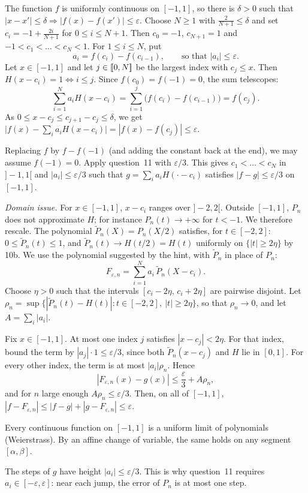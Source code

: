 \documentclass[11pt,a4paper]{article}
\begin{document}
The function $f$ is uniformly continuous on $[-1,1]$, so there is $\delta>0$ such that
$|x-x'|\le\delta \Rightarrow |f(x)-f(x')|\le\varepsilon$. Choose $N\ge1$ with
$\frac2{N+1}\le\delta$ and set $c_i = -1 + \frac{2i}{N+1}$ for $0\le i\le N+1$. Then
$c_0 = -1$, $c_{N+1} = 1$ and $-1 < c_1 < \dots < c_N < 1$. For $1 \le i \le N$, put
\[
  a_i = f(c_i) - f(c_{i-1}), \qquad\text{so that } |a_i|\le\varepsilon .
\]
Let $x\in[-1,1]$ and let $j\in[\![0,N]\!]$ be the largest index with $c_j\le x$. Then
$H(x-c_i) = 1 \iff i \le j$. Since $f(c_0) = f(-1) = 0$, the sum telescopes:
\[
  \sum_{i=1}^N a_i H(x-c_i) = \sum_{i=1}^{j}\bigl(f(c_i)-f(c_{i-1})\bigr) = f(c_j).
\]
As $0\le x-c_j\le c_{j+1}-c_j\le\delta$, we get
$\bigl|f(x) - \sum_i a_iH(x-c_i)\bigr| = |f(x)-f(c_j)| \le \varepsilon$.

Replacing $f$ by $f - f(-1)$ (and adding the constant back at the end), we may assume
$f(-1) = 0$. Apply question~11 with $\varepsilon/3$. This gives $c_1<\dots<c_N$ in $]-1,1[$
and $|a_i|\le\varepsilon/3$ such that $g = \sum_i a_iH(\cdot-c_i)$ satisfies
$|f-g|\le\varepsilon/3$ on $[-1,1]$.

\emph{Domain issue.} For $x\in[-1,1]$, $x - c_i$ ranges over $]-2,2[$. Outside $[-1,1]$,
$P_n$ does not approximate $H$; for instance $P_n(t)\to+\infty$ for $t<-1$. We therefore
rescale. The polynomial $\widetilde P_n(X) = P_n(X/2)$ satisfies, for $t\in[-2,2]$:
$0\le\widetilde P_n(t)\le1$, and $\widetilde P_n(t)\to H(t/2) = H(t)$ uniformly on
$\{|t|\ge2\eta\}$ by 10b. We use the polynomial suggested by the hint, with $\widetilde P_n$
in place of $P_n$:
\[
  F_{\varepsilon,n} = \sum_{i=1}^N a_i\,\widetilde P_n(X-c_i).
\]
Choose $\eta>0$ such that the intervals $[c_i-2\eta,\,c_i+2\eta]$ are pairwise disjoint. Let
$\rho_n = \sup\{|\widetilde P_n(t)-H(t)| : t\in[-2,2],\ |t|\ge2\eta\}$, so that
$\rho_n\to0$, and let $A = \sum_i|a_i|$.

Fix $x\in[-1,1]$. At most one index $j$ satisfies $|x-c_j|<2\eta$. For that index, bound the
term by $|a_j|\cdot1\le\varepsilon/3$, since both $\widetilde P_n(x-c_j)$ and $H$ lie in
$[0,1]$. For every other index, the term is at most $|a_i|\rho_n$. Hence
\[
  |F_{\varepsilon,n}(x) - g(x)| \le \frac\varepsilon3 + A\rho_n ,
\]
and for $n$ large enough $A\rho_n\le\varepsilon/3$. Then, on all of $[-1,1]$,
$|f - F_{\varepsilon,n}| \le |f-g| + |g - F_{\varepsilon,n}| \le \varepsilon$.
\begin{result}
Every continuous function on $[-1,1]$ is a uniform limit of polynomials (Weierstrass). By an
affine change of variable, the same holds on any segment $[\alpha,\beta]$.
\end{result}
The steps of $g$ have height $|a_i|\le\varepsilon/3$. This is why question~11 requires
$a_i\in[-\varepsilon,\varepsilon]$: near each jump, the error of $P_n$ is at most one step.
\end{document}

